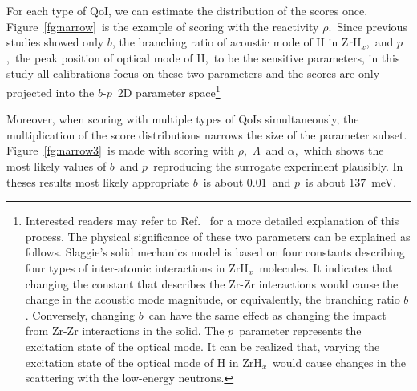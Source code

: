 \documentclass[review]{elsarticle}
\newcommand{\zh}{ZrH$_x$}
\begin{document}

For each type of QoI, we can estimate the distribution of the scores once. Figure~\ref{fg:narrow}~is the example of scoring with the reactivity $\rho$.~Since previous studies \cite{weixiong,physor} showed only $b$, the branching ratio of acoustic mode of H in \zh,~and $p$,~the peak position of optical mode of H,~to be the sensitive parameters, in this study all calibrations focus on these two parameters and the scores are only projected into the $b$-$p$~2D parameter space\footnote{Interested readers may refer to Ref.~\cite{santner2003design} for a more detailed explanation of this process. The physical significance of these two parameters can be explained as follows. Slaggie's solid mechanics model is based on four constants describing four types of inter-atomic interactions in \zh\ molecules\cite{Slaggie}. It indicates that changing the constant that describes the Zr-Zr interactions would cause the change in the acoustic mode magnitude, or equivalently, the branching ratio $b$. Conversely, changing $b$\ can have the same effect as changing the impact from Zr-Zr interactions in the solid. The $p$\ parameter represents the excitation state of the optical mode. It can be realized that, varying the excitation state of the optical mode of H in \zh\ would cause changes in the scattering with the low-energy neutrons.} 

Moreover, when scoring with multiple types of QoIs simultaneously, the multiplication of the score distributions  narrows the size of the parameter subset. Figure~\ref{fg:narrow3}~is made with scoring with $\rho$,~$\Lambda$~and $\alpha$,~which shows the most likely values of $b$~and $p$~reproducing the surrogate experiment plausibly. In theses results most likely appropriate $b$~is about $0.01$~and $p$~is about $137$~meV.
\end{document}
